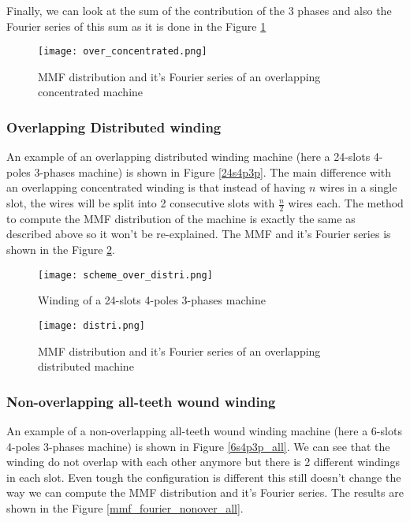 Finally, we can look at the sum of the contribution of the 3 phases and also the Fourier series of this sum as it is done in the Figure \ref{mmf_fourier_over_concentrated}
\begin{figure}[H]
    \centering
    \texttt{[image: over\_concentrated.png]}
    \caption{MMF distribution and it's Fourier series of an overlapping concentrated machine}
    \label{mmf_fourier_over_concentrated}
\end{figure}

\subsubsection{Overlapping Distributed winding}
An example of an overlapping distributed winding machine (here a 24-slots 4-poles 3-phases machine) is shown in Figure \ref{24s4p3p}. The main difference with an overlapping concentrated winding is that instead of having $n$ wires in a single slot, the wires will be split into 2 consecutive slots with $\frac{n}{2}$ wires each. The method to compute the MMF distribution of the machine is exactly the same as described above so it won't be re-explained. The MMF and it's Fourier series is shown in the Figure \ref{mmf_fourier_over_distributed}.

\begin{figure}[H]
    \begin{minipage}{.45 \textwidth }
        \centering
        \texttt{[image: scheme\_over\_distri.png]}
        \caption{Winding of a 24-slots 4-poles 3-phases machine}
        \label{24s4p3p}
    \end{minipage}
    \begin{minipage}{.45 \textwidth }
        \centering
        \texttt{[image: distri.png]}
        \caption{MMF distribution and it's Fourier series of an overlapping distributed machine}
        \label{mmf_fourier_over_distributed}
    \end{minipage}
\end{figure}

\subsubsection{Non-overlapping all-teeth wound winding}
An example of a non-overlapping all-teeth wound winding machine (here a 6-slots 4-poles 3-phases machine) is shown in Figure \ref{6s4p3p_all}. We can see that the winding do not overlap with each other anymore but there is 2 different windings in each slot. Even tough the configuration is different this still doesn't change the way we can compute the MMF distribution and it's Fourier series. The results are shown in the Figure \ref{mmf_fourier_nonover_all}.

